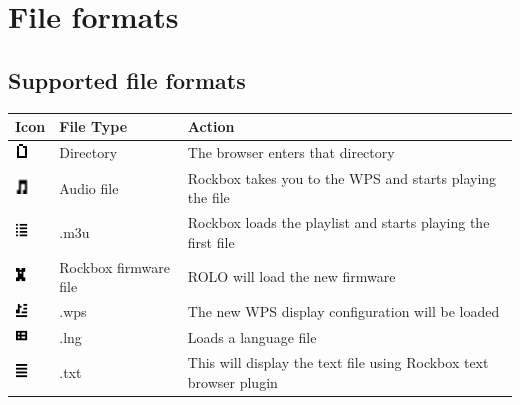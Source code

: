 \appendix
\chapter{File formats}
\section{\label{ref:Supportedfileformats}Supported file formats}
\begin{center}
\begin{tabularx}{\textwidth}{llX}\toprule
\textbf{Icon} & \textbf{File Type} & \textbf{Action} \\\midrule
\includegraphics[width=0.37cm]{appendix/images/icon-directory.png} 
  & Directory & The browser enters that directory \\
\includegraphics[width=0.37cm]{appendix/images/icon-audio-file.png} 
  & Audio file & Rockbox takes you to the WPS and starts playing the file \\
\includegraphics[width=0.37cm]{appendix/images/icon-playlist.png} 
  & .m3u & Rockbox loads the playlist and starts playing the first file \\
\includegraphics[width=0.37cm]{appendix/images/icon-rolo.png} 
  & Rockbox firmware file &  ROLO will load the new firmware \\
\includegraphics[width=0.37cm]{appendix/images/icon-wps.png} 
  & .wps & The new WPS display configuration will be loaded \\
\includegraphics[width=0.37cm]{appendix/images/icon-lang.png} 
  & .lng & Loads a language file \\
\includegraphics[width=0.37cm]{appendix/images/icon-text.png} 
  & .txt & This will display the text file using Rockbox text browser plugin\\

\end{tabularx}
\end{center}
